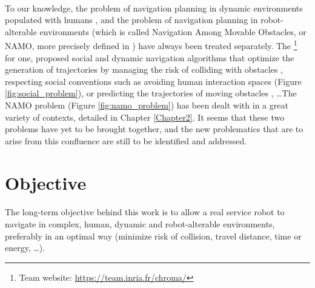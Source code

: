 \paragraph{} To our knowledge, the problem of navigation planning in dynamic environments populated with humans \parencite{kruse_human-aware_2013, rios-martinez_proxemics_2015}, and the problem of navigation planning in robot-alterable environments (which is called Navigation Among Movable Obstacles, or NAMO, more precisely defined in \parencite{stilman_navigation_2007}) have always been treated separately. The \groupname \footnote{Team website: \url{https://team.inria.fr/chroma/}} \, for one, proposed social and dynamic navigation algorithms that optimize the generation of trajectories by managing the risk of colliding with obstacles \parencite{fulgenzi_autonomous_2009, rios-martinez_socially-aware_2013}, respecting social conventions such as avoiding human interaction spaces \parencite{papadakis_adaptive_2014, rios-martinez_understanding_2011} (Figure \ref{fig:social_problem}), or predicting the trajectories of moving obstacles \parencite{jumel_mapping_2017}, \dots The NAMO problem (Figure \ref{fig:namo_problem}) has been dealt with in a great variety of contexts, detailed in Chapter \ref{Chapter2}. It seems that these two problems have yet to be brought together, and the new problematics that are to arise from this confluence are still to be identified and addressed.

\section{Objective}

\paragraph{} The long-term objective behind this work is to allow a real service robot to navigate in complex, human, dynamic and robot-alterable environments, preferably in an optimal way (minimize risk of collision, travel distance, time or energy, \dots).


